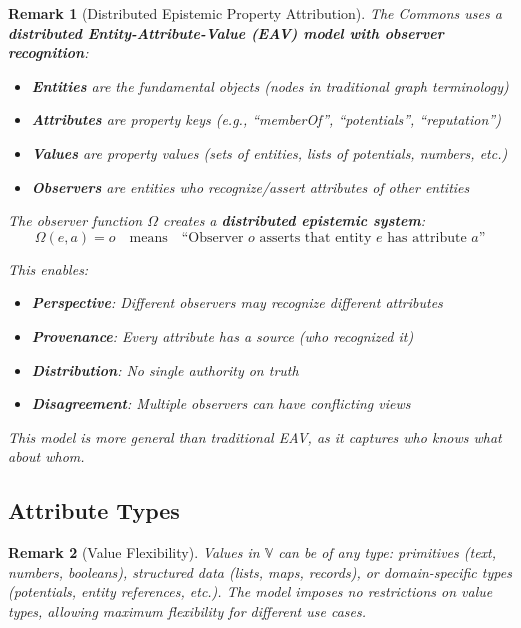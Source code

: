 \documentclass[11pt]{article}
\newtheorem{remark}{Remark}
\begin{document}
\begin{remark}[Distributed Epistemic Property Attribution]
The Commons uses a \textbf{distributed Entity-Attribute-Value (EAV) model with observer recognition}:
\begin{itemize}
\item \textbf{Entities} are the fundamental objects (nodes in traditional graph terminology)
\item \textbf{Attributes} are property keys (e.g., ``memberOf'', ``potentials'', ``reputation'')
\item \textbf{Values} are property values (sets of entities, lists of potentials, numbers, etc.)
\item \textbf{Observers} are entities who recognize/assert attributes of other entities
\end{itemize}

The observer function $\Omega$ creates a \textbf{distributed epistemic system}:
\[
\Omega(e, a) = o \quad \text{means} \quad \text{``Observer } o \text{ asserts that entity } e \text{ has attribute } a\text{''}
\]

This enables:
\begin{itemize}
\item \textbf{Perspective}: Different observers may recognize different attributes
\item \textbf{Provenance}: Every attribute has a source (who recognized it)
\item \textbf{Distribution}: No single authority on truth
\item \textbf{Disagreement}: Multiple observers can have conflicting views
\end{itemize}

This model is more general than traditional EAV, as it captures \emph{who knows what about whom}.
\end{remark}

\subsection{Attribute Types}

\begin{remark}[Value Flexibility]
Values in $\mathbb{V}$ can be of any type: primitives (text, numbers, booleans), structured data (lists, maps, records), or domain-specific types (potentials, entity references, etc.). The model imposes no restrictions on value types, allowing maximum flexibility for different use cases.
\end{remark}
\end{document}
